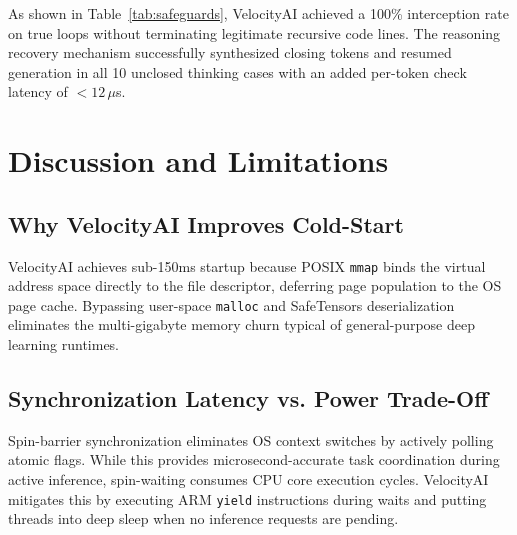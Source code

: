\documentclass[10pt,twocolumn]{article}
\begin{document}
\begin{table}[htbp]
\caption{Safeguard Recovery Accuracy and False Positive Audit}
\label{tab:safeguards}
\centering
{}
\end{table}

As shown in Table~\ref{tab:safeguards}, VelocityAI achieved a 100\% interception rate on true loops without terminating legitimate recursive code lines. The reasoning recovery mechanism successfully synthesized closing tokens and resumed generation in all 10 unclosed thinking cases with an added per-token check latency of $< 12\,\mu$s.

\section{Discussion and Limitations}

\subsection{Why VelocityAI Improves Cold-Start}
VelocityAI achieves sub-150ms startup because POSIX \texttt{mmap} binds the virtual address space directly to the file descriptor, deferring page population to the OS page cache. Bypassing user-space \texttt{malloc} and SafeTensors deserialization eliminates the multi-gigabyte memory churn typical of general-purpose deep learning runtimes.

\subsection{Synchronization Latency vs. Power Trade-Off}
Spin-barrier synchronization eliminates OS context switches by actively polling atomic flags. While this provides microsecond-accurate task coordination during active inference, spin-waiting consumes CPU core execution cycles. VelocityAI mitigates this by executing ARM \texttt{yield} instructions during waits and putting threads into deep sleep when no inference requests are pending.
\end{document}

